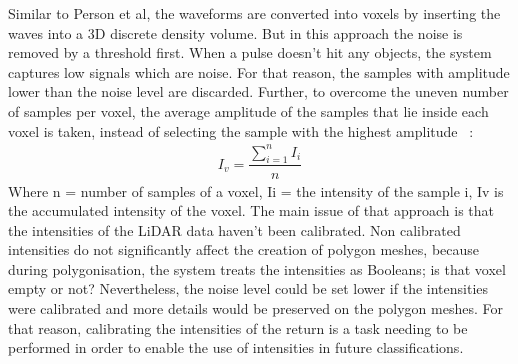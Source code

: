 \documentclass{subfiles}
\begin{document}
Similar to Person et al, the waveforms are converted into voxels by inserting the waves into a 3D discrete density volume. But in this approach the noise is removed by a threshold first. When a pulse doesn’t hit any objects, the system captures low signals which are noise. For that reason, the samples with amplitude lower than the noise level are discarded. Further, to overcome the uneven number of samples per voxel, the average amplitude of the samples that lie inside each voxel is taken, instead of selecting the sample with the highest amplitude ~\cite{Persson2005}:
	\begin{eqnarray}
		I_{v} = \dfrac{\sum_{i=1}^{n}I_{i}}{n}
	\end{eqnarray} 
Where 	n = number of samples of a voxel, 
	Ii = the intensity of the sample i, 
	Iv is the accumulated intensity of the voxel.  
The main issue of that approach is that the intensities of the LiDAR data haven’t been calibrated. Non calibrated intensities do not significantly affect the creation of polygon meshes, because during polygonisation, the system treats the intensities as Booleans; is that voxel empty or not? Nevertheless, the noise level could be set lower if the intensities were calibrated and more details would be preserved on the polygon meshes. For that reason, calibrating the intensities of the return is a task needing to be performed in order to enable the use of intensities in future classifications. 
\end{document}
